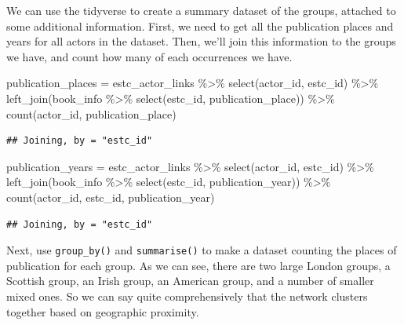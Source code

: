\documentclass[
]{book}
\newenvironment{Shaded}{\begin{snugshade}}{\end{snugshade}}
\newcommand{\FunctionTok}[1]{\textcolor[rgb]{0.00,0.00,0.00}{#1}}
\newcommand{\NormalTok}[1]{#1}
\newcommand{\OtherTok}[1]{\textcolor[rgb]{0.56,0.35,0.01}{#1}}
\newcommand{\SpecialCharTok}[1]{\textcolor[rgb]{0.00,0.00,0.00}{#1}}
\begin{document}
We can use the tidyverse to create a summary dataset of the groups, attached to some additional information. First, we need to get all the publication places and years for all actors in the dataset. Then, we'll join this information to the groups we have, and count how many of each occurrences we have.

\begin{Shaded}
\begin{Highlighting}[]
\NormalTok{publication\_places }\OtherTok{=}\NormalTok{ estc\_actor\_links }\SpecialCharTok{\%\textgreater{}\%} 
  \FunctionTok{select}\NormalTok{(actor\_id, estc\_id) }\SpecialCharTok{\%\textgreater{}\%} 
  \FunctionTok{left\_join}\NormalTok{(book\_info }\SpecialCharTok{\%\textgreater{}\%} 
              \FunctionTok{select}\NormalTok{(estc\_id, publication\_place)) }\SpecialCharTok{\%\textgreater{}\%} 
  \FunctionTok{count}\NormalTok{(actor\_id, publication\_place) }
\end{Highlighting}
\end{Shaded}

\begin{verbatim}
## Joining, by = "estc_id"
\end{verbatim}

\begin{Shaded}
\begin{Highlighting}[]
\NormalTok{publication\_years }\OtherTok{=}\NormalTok{ estc\_actor\_links }\SpecialCharTok{\%\textgreater{}\%} 
  \FunctionTok{select}\NormalTok{(actor\_id, estc\_id) }\SpecialCharTok{\%\textgreater{}\%} 
  \FunctionTok{left\_join}\NormalTok{(book\_info }\SpecialCharTok{\%\textgreater{}\%} 
              \FunctionTok{select}\NormalTok{(estc\_id, publication\_year)) }\SpecialCharTok{\%\textgreater{}\%} 
  \FunctionTok{count}\NormalTok{(actor\_id, estc\_id, publication\_year) }
\end{Highlighting}
\end{Shaded}

\begin{verbatim}
## Joining, by = "estc_id"
\end{verbatim}

Next, use \texttt{group\_by()} and \texttt{summarise()} to make a dataset counting the places of publication for each group. As we can see, there are two large London groups, a Scottish group, an Irish group, an American group, and a number of smaller mixed ones. So we can say quite comprehensively that the network clusters together based on geographic proximity.
\end{document}
